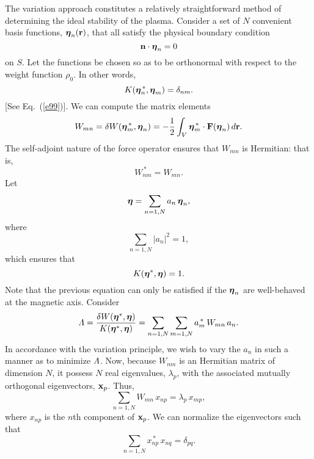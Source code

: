 \documentclass[12pt,prb,aps,notitlepage]{revtex4-1}
\newcommand{\bta}{\mbox{\boldmath$\eta$}}
\begin{document}
The variation approach constitutes a relatively straightforward method of determining the ideal stability of the plasma. 
Consider a set of $N$ convenient basis functions, $\bta_n({\bf r})$, that all satisfy the physical boundary condition
\begin{equation}
{\bf n}\cdot\bta_n=0
\end{equation}
on $S$. Let the functions be chosen so as to be orthonormal with respect to the weight function $\rho_0$. In other words,
\begin{equation}
K(\bta_n^{\,\ast},\bta_m) = \delta_{nm}.
\end{equation}
[See Eq.~(\ref{e99})]. We can compute the matrix elements
\begin{equation}
W_{mn} = \delta W(\bta_m^{\,\ast},\bta_n)= -\frac{1}{2}\int_V\bta_m^{\,\ast}\cdot {\bf F}(\bta_n)\,d{\bf r}.
\end{equation}
The self-adjoint nature of the force operator ensures that $W_{mn}$ is Hermitian: that is, 
\begin{equation}
W_{nm}^{\,\ast}= W_{mn}.
\end{equation}
Let
\begin{equation}
\bta = \sum_{n=1,N} a_n\,\bta_n,
\end{equation}
where
\begin{equation}
\sum_{n=1,N} |a_n|^2 = 1,
\end{equation}
which ensures that 
\begin{equation}
K(\bta^\ast,\bta) = 1.
\end{equation}
Note that the previous equation can only be satisfied if the $\bta_n$ are well-behaved at the magnetic axis. 
Consider 
\begin{equation}
{\mit\Lambda} = \frac{\delta W(\bta^\ast,\bta)}{K(\bta^\ast,\bta)}= \sum_{n=1,N}\sum_{m=1,N}a_m^{\,\ast}\,W_{mn}\,a_n.
\end{equation}
In accordance with the variation principle, we wish to vary the $a_n$ in such a manner as to minimize ${\mit\Lambda}$. 
Now, because $W_{nm}$ is an Hermitian matrix of dimension $N$, it possess $N$ real eigenvalues, $\lambda_p$, with the
associated mutually orthogonal eigenvectors, ${\bf x}_p$. Thus,
\begin{equation}
\sum_{n=1,N}W_{mn}\,x_{np}=  \lambda_p\,x_{mp},
\end{equation}
where $x_{np}$ is the $n$th component of ${\bf x}_p$. We can normalize the eigenvectors such that
\begin{equation}
\sum_{n=1,N} x_{np}^{\,\ast}\,x_{nq} = \delta_{pq}.
\end{equation}
\end{document}
